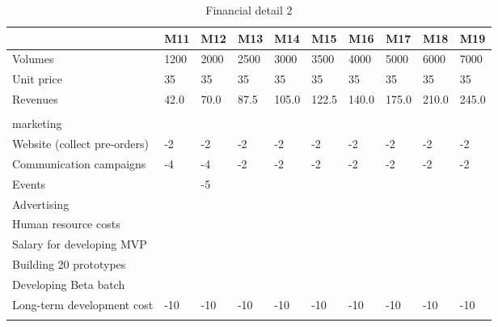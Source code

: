 \documentclass[12pt,twoside]{article}
\begin{document}
\begin{table}[]
    \caption{Financial detail 2}
    \begin{tabular}{|l|l|l|l|l|l|l|l|l|l|}
        \hline
                                 & M11  & M12  & M13   & M14   & M15   & M16   & M17   & M18   & M19   \\ \hline
    Volumes                      & 1200 & 2000 & 2500  & 3000  & 3500  & 4000  & 5000  & 6000  & 7000  \\ \hline
    Unit price                   & 35   & 35   & 35    & 35    & 35    & 35    & 35    & 35    & 35    \\ \hline
    Revenues                     & 42.0 & 70.0 & 87.5  & 105.0 & 122.5 & 140.0 & 175.0 & 210.0 & 245.0 \\ \hline
                                 &      &      &       &       &       &       &       &       &       \\ \hline
    marketing                    &      &      &       &       &       &       &       &       &       \\ \hline
    Website (collect pre-orders) & -2   & -2   & -2    & -2    & -2    & -2    & -2    & -2    & -2    \\ \hline
    Communication campaigns      & -4   & -4   & -2    & -2    & -2    & -2    & -2    & -2    & -2    \\ \hline
    Events                       &      & -5   &       &       &       &       &       &       &       \\ \hline
    Advertising                  &      &      &       &       &       &       &       &       &       \\ \hline
    Human resource costs         &      &      &       &       &       &       &       &       &       \\ \hline
    Salary for developing MVP    &      &      &       &       &       &       &       &       &       \\ \hline
    Building 20 prototypes       &      &      &       &       &       &       &       &       &       \\ \hline
    Developing Beta batch        &      &      &       &       &       &       &       &       &       \\ \hline
    Long-term development cost   & -10  & -10  & -10   & -10   & -10   & -10   & -10   & -10   & -10   \\ \hline
                                 &      &      &       &       &       &       &       &       &       \\ \hline

\end{tabular}
\end{table}
\end{document}

